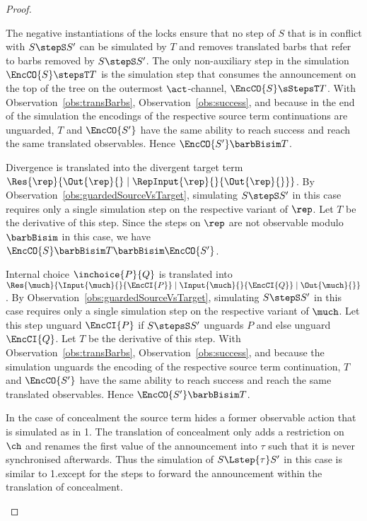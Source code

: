 \documentclass[]{eptcs}
\begin{document}
\begin{proof}
\begin{compactitem}
\begin{compactenum}
					The negative instantiations of the locks ensure that no step of $ S $ that is in conflict with $ S \stepS S' $ can be simulated by $ T $ and removes translated barbs that refer to barbs removed by $ S \stepS S' $.
					The only non-auxiliary step in the simulation $ \EncCO{S} \stepsT T $ is the simulation step that consumes the announcement on the top of the tree on the outermost $ \act $-channel, \ie $ \EncCO{S} \sStepsT T $. With Observation~\ref{obs:transBarbs}, Observation~\ref{obs:success}, and because in the end of the simulation the encodings of the respective source term continuations are unguarded, $ T $ and $ \EncCO{S'} $ have the same ability to reach success and reach the same translated observables. Hence $ \EncCO{S'} \barbBisim T $.
				\item Divergence is translated into the divergent target term $ \Res{\rep}{\Out{\rep}{} \mid \RepInput{\rep}{}{\Out{\rep}{}}} $. By Observation~\ref{obs:guardedSourceVsTarget}, simulating $ S \stepS S' $ in this case requires only a single simulation step on the respective variant of $ \rep $. Let $ T $ be the derivative of this step. Since the steps on $ \rep $ are not observable modulo $ \barbBisim $ in this case, we have $ \EncCO{S} \barbBisim T \barbBisim \EncCO{S'} $.
				\item Internal choice $ \inchoice{P}{Q} $ is translated into $ \Res{\much}{\Input{\much}{}{\EncCI{P}} \mid \Input{\much}{}{\EncCI{Q}} \mid \Out{\much}{}} $. By Observation~\ref{obs:guardedSourceVsTarget}, simulating $ S \stepS S' $ in this case requires only a single simulation step on the respective variant of $ \much $. Let this step unguard $ \EncCI{P} $ if $ S \stepsS S' $ unguards $ P $ and else unguard $ \EncCI{Q} $. Let $ T $ be the derivative of this step. With Observation~\ref{obs:transBarbs}, Observation~\ref{obs:success}, and because the simulation unguards the encoding of the respective source term continuation, $ T $ and $ \EncCO{S'} $ have the same ability to reach success and reach the same translated observables. Hence $ \EncCO{S'} \barbBisim T $.
				\item In the case of concealment the source term hides a former observable action that is simulated as in 1. The translation of concealment only adds a restriction on $ \ch $ and renames the first value of the announcement into $ \tau $ such that it is never synchronised afterwards. Thus the simulation of $ S \Lstep{\tau} S' $ in this case is similar to 1.\@ except for the steps to forward the announcement within the translation of concealment.

\end{compactenum}
\end{compactitem}
\end{proof}
\end{document}
